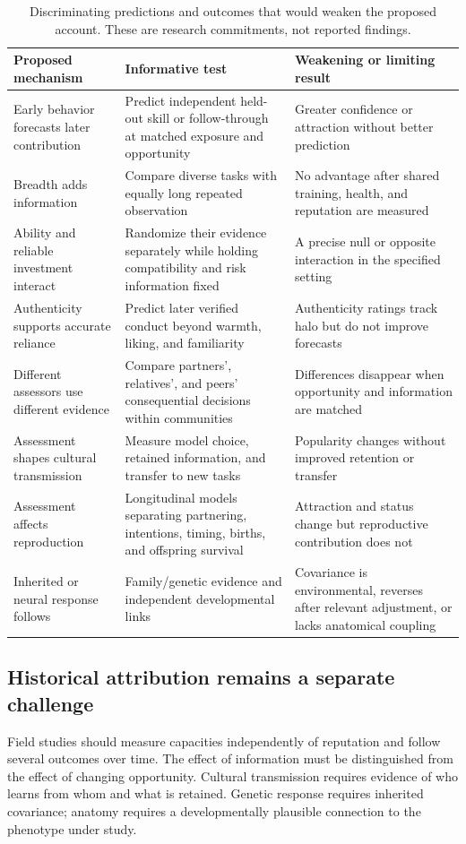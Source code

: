\documentclass[10pt,twocolumn,letterpaper]{article}
\begin{document}
\begin{table}[t]
\caption{Discriminating predictions and outcomes that would weaken the proposed account. These are research commitments, not reported findings.}
\label{tab:tests}
\small\begin{tabularx}{\textwidth}{L{.20\textwidth}Y Y}
\toprule
Proposed mechanism & Informative test & Weakening or limiting result\\
\midrule
Early behavior forecasts later contribution & Predict independent held-out skill or follow-through at matched exposure and opportunity & Greater confidence or attraction without better prediction\\
Breadth adds information & Compare diverse tasks with equally long repeated observation & No advantage after shared training, health, and reputation are measured\\
Ability and reliable investment interact & Randomize their evidence separately while holding compatibility and risk information fixed & A precise null or opposite interaction in the specified setting\\
Authenticity supports accurate reliance & Predict later verified conduct beyond warmth, liking, and familiarity & Authenticity ratings track halo but do not improve forecasts\\
Different assessors use different evidence & Compare partners', relatives', and peers' consequential decisions within communities & Differences disappear when opportunity and information are matched\\
Assessment shapes cultural transmission & Measure model choice, retained information, and transfer to new tasks & Popularity changes without improved retention or transfer\\
Assessment affects reproduction & Longitudinal models separating partnering, intentions, timing, births, and offspring survival & Attraction and status change but reproductive contribution does not\\
Inherited or neural response follows & Family/genetic evidence and independent developmental links & Covariance is environmental, reverses after relevant adjustment, or lacks anatomical coupling\\
\bottomrule
\end{tabularx}
\end{table}

\subsection{Historical attribution remains a separate challenge}
Field studies should measure capacities independently of reputation and follow several outcomes over time. The effect of information must be distinguished from the effect of changing opportunity. Cultural transmission requires evidence of who learns from whom and what is retained. Genetic response requires inherited covariance; anatomy requires a developmentally plausible connection to the phenotype under study.
\end{document}
